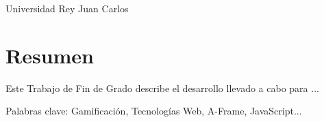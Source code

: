 \newpage
Universidad Rey Juan Carlos \setlength{\parskip}{0.5cm}

\thispagestyle{plain}			%
\setlength{\parskip}{0pt plus 1.0pt}
\section*{Resumen}
Este Trabajo de Fin de Grado describe el desarrollo llevado a cabo para ...


\vfill
Palabras clave: Gamificación, Tecnologías Web, A-Frame, JavaScript...


